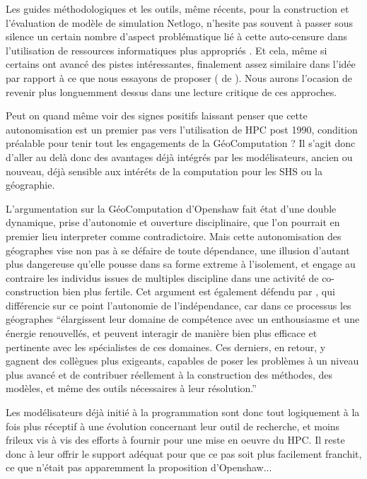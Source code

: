Les guides méthodologiques et les outils, même récents, pour la construction et l'évaluation de modèle de simulation Netlogo, n'hesite pas souvent à passer sous silence un certain nombre d'aspect problématique lié à cette auto-censure dans l'utilisation de ressources informatiques plus appropriés \autocites{Gilbert2008, Grimm2011a}. Et cela, même si certains ont avancé des pistes intéressantes, finalement assez similaire dans l'idée par rapport à ce que nous essayons de proposer (\textcite{Behavior Search} de \textcite{Stonedahl2011a}). Nous aurons l'ocasion de revenir plus longuemment dessus dans une lecture critique de ces approches.

Peut on quand même voir des signes positifs laissant penser que cette autonomisation est un premier pas vers l'utilisation de HPC post 1990, condition préalable pour tenir tout les engagements de la GéoComputation ? Il s'agit donc d'aller au delà donc des avantages déjà intégrés par les modélisateurs, ancien ou nouveau, déjà sensible aux intéréts de la computation pour les SHS ou la géographie.

L’argumentation sur la GéoComputation d’Openshaw fait état d’une double dynamique, prise d'autonomie et ouverture disciplinaire, que l’on pourrait en premier lieu interpreter comme contradictoire. Mais cette autonomisation des géographes vise non pas à se défaire de toute dépendance, une illusion d’autant plus dangereuse qu’elle pousse dans sa forme extreme à l’isolement, et engage au contraire les individus issues de multiples discipline dans une activité de co-construction bien plus fertile. Cet argument est également défendu par \autocite[64]{Banos2013}, qui différencie sur ce point l’autonomie de l’indépendance, car dans ce processus les géographes \enquote{élargissent leur domaine de compétence avec un enthousiasme et une énergie renouvellés, et peuvent interagir de manière bien plus efficace et pertinente avec les spécialistes de ces domaines. Ces derniers, en retour, y gagnent des collègues plus exigeants, capables de poser les problèmes à un niveau plus avancé et de contribuer réellement à la construction des méthodes, des modèles, et même des outils nécessaires à leur résolution.}

Les modélisateurs déjà initié à la programmation sont donc tout logiquement à la fois plus réceptif à une évolution concernant leur outil de recherche, et moins frileux vis à vis des efforts à fournir pour une mise en oeuvre du HPC. Il reste donc à leur offrir le support adéquat pour que ce pas soit plus facilement franchit, ce que n'était pas apparemment la proposition d'Openshaw...

